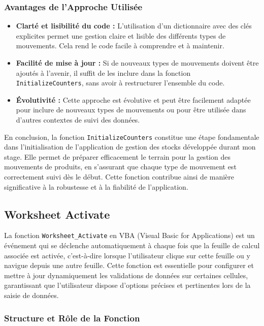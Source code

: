 \documentclass[a4paper, oneside, 12pt, final]{extreport}
\begin{document}
\subsubsection{Avantages de l'Approche Utilisée}
\begin{itemize}
    \item \textbf{Clarté et lisibilité du code :} L'utilisation d'un dictionnaire avec des clés explicites permet une gestion claire et lisible des différents types de mouvements. Cela rend le code facile à comprendre et à maintenir.
    \item \textbf{Facilité de mise à jour :} Si de nouveaux types de mouvements doivent être ajoutés à l'avenir, il suffit de les inclure dans la fonction \texttt{InitializeCounters}, sans avoir à restructurer l'ensemble du code.
    \item \textbf{Évolutivité :} Cette approche est évolutive et peut être facilement adaptée pour inclure de nouveaux types de mouvements ou pour être utilisée dans d'autres contextes de suivi des données.
\end{itemize}


En conclusion, la fonction \texttt{InitializeCounters} constitue une étape fondamentale dans l'initialisation de l'application de gestion des stocks développée durant mon stage. Elle permet de préparer efficacement le terrain pour la gestion des mouvements de produits, en s'assurant que chaque type de mouvement est correctement suivi dès le début. Cette fonction contribue ainsi de manière significative à la robustesse et à la fiabilité de l'application.

\subsection{ Worksheet Activate}
La fonction \texttt{Worksheet\_Activate} en VBA (Visual Basic for Applications) est un événement qui se déclenche automatiquement à chaque fois que la feuille de calcul associée est activée, c’est-à-dire lorsque l’utilisateur clique sur cette feuille ou y navigue depuis une autre feuille. Cette fonction est essentielle pour configurer et mettre à jour dynamiquement les validations de données sur certaines cellules, garantissant que l'utilisateur dispose d'options précises et pertinentes lors de la saisie de données.

\subsubsection{Structure et Rôle de la Fonction}
\end{document}

